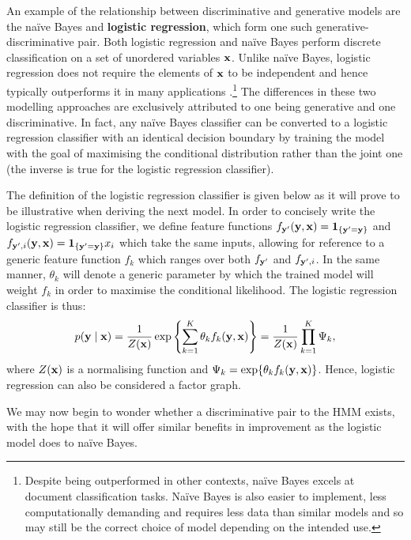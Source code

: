 \documentclass[../main.tex]{subfiles}
\begin{document}
An example of the relationship between discriminative and generative models are the na{\"i}ve Bayes and \textbf{logistic regression}, which form one such generative-discriminative pair.
Both logistic regression and na{\"i}ve Bayes perform discrete classification on a set of unordered variables $\mathbf{x}$. Unlike na{\"i}ve Bayes, logistic regression does not require the elements of $\mathbf{x}$ to be independent and hence typically outperforms it in many applications \autocite{log-reg-vs-nb}.\footnote{Despite being outperformed in other contexts, na{\"i}ve Bayes excels at document classification tasks. Na{\"i}ve Bayes is also easier to implement, less computationally demanding and requires less data than similar models and so may still be the correct choice of model depending on the intended use.}
The differences in these two modelling approaches are exclusively attributed to one being generative and one discriminative.
In fact, any na{\"i}ve Bayes classifier can be converted to a logistic regression classifier with an identical decision boundary by training the model with the goal of maximising the conditional distribution rather than the joint one (the inverse is true for the logistic regression classifier).

The definition of the logistic regression classifier is given below as it will prove to be illustrative when deriving the next model.
In order to concisely write the logistic regression classifier, we define feature functions $f_{\mathbf{y}'}(\mathbf{y},\mathbf{x})=\mathbf{1}_{\{\mathbf{y}'=\mathbf{y}\}}$ and $f_{\mathbf{y}',i}(\mathbf{y},\mathbf{x})=\mathbf{1}_{\{\mathbf{y}'=\mathbf{y}\}}x_i$ which take the same inputs, allowing for reference to a generic feature function $f_k$ which ranges over both $f_{\mathbf{y}'}$ and $f_{\mathbf{y}',i}$.
In the same manner, $\theta_k$ will denote a generic parameter by which the trained model will weight $f_k$ in order to maximise the conditional likelihood. The logistic regression classifier is thus:
\begin{equation} \label{eq:log-reg}
     p(\mathbf{y} \mid \mathbf{x}) = \frac{1}{Z(\mathbf{x})} \exp \left\{ \sum_{k=1}^K \theta_k f_k(\mathbf{y},\mathbf{x}) \right\} = \frac{1}{Z(\mathbf{x})} \prod_{k=1}^K \Psi_k,
\end{equation}
where $Z(\mathbf{x})$ is a normalising function and $\Psi_k = \exp \{ \theta_k f_k(\mathbf{y},\mathbf{x}) \}$. Hence, logistic regression can also be considered a factor graph.

We may now begin to wonder whether a discriminative pair to the HMM exists, with the hope that it will offer similar benefits in improvement as the logistic model does to na{\"i}ve Bayes.
\end{document}

